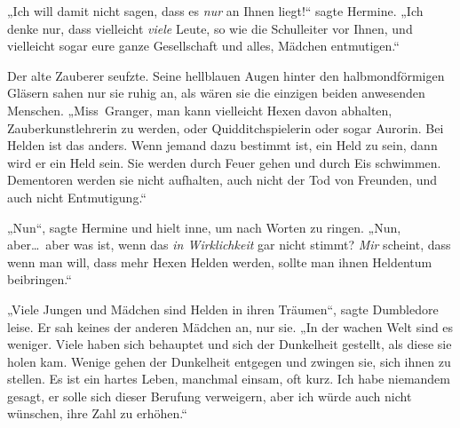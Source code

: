 „Ich will damit nicht sagen, dass es \emph{nur} an Ihnen liegt!“ sagte Hermine. „Ich denke nur, dass vielleicht \emph{viele} Leute, so wie die Schulleiter vor Ihnen, und vielleicht sogar eure ganze Gesellschaft und alles, Mädchen entmutigen.“

Der alte Zauberer seufzte. Seine hellblauen Augen hinter den halbmondförmigen Gläsern sahen nur sie ruhig an, als wären sie die einzigen beiden anwesenden Menschen. „Miss~Granger, man kann vielleicht Hexen davon abhalten, Zauberkunstlehrerin zu werden, oder Quidditchspielerin oder sogar Aurorin. Bei Helden ist das anders. Wenn jemand dazu bestimmt ist, ein Held zu sein, dann wird er ein Held sein. Sie werden durch Feuer gehen und durch Eis schwimmen. Dementoren werden sie nicht aufhalten, auch nicht der Tod von Freunden, und auch nicht Entmutigung.“

„Nun“, sagte Hermine und hielt inne, um nach Worten zu ringen. „Nun, aber…~aber was ist, wenn das \emph{in Wirklichkeit} gar nicht stimmt? \emph{Mir} scheint, dass wenn man will, dass mehr Hexen Helden werden, sollte man ihnen Heldentum beibringen.“

„Viele Jungen und Mädchen sind Helden in ihren Träumen“, sagte Dumbledore leise. Er sah keines der anderen Mädchen an, nur sie. „In der wachen Welt sind es weniger. Viele haben sich behauptet und sich der Dunkelheit gestellt, als diese sie holen kam. Wenige gehen der Dunkelheit entgegen und zwingen sie, sich ihnen zu stellen. Es ist ein hartes Leben, manchmal einsam, oft kurz. Ich habe niemandem gesagt, er solle sich dieser Berufung verweigern, aber ich würde auch nicht wünschen, ihre Zahl zu erhöhen.“

